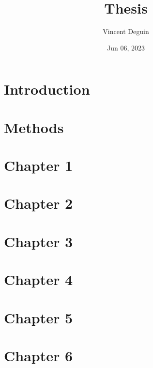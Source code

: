 \documentclass[letterpaper,10pt,english]{jupyterBook}
\title{Thesis}
\date{Jun 06, 2023}
\author{Vincent Deguin}
\begin{document}
\pagestyle{empty}
\sphinxmaketitle
\pagestyle{plain}
\sphinxtableofcontents
\pagestyle{normal}
\label{\detokenize{intro::doc}}


\sphinxstepscope


\chapter{Introduction}
\label{\detokenize{Introduction/Introduction:introduction}}\label{\detokenize{Introduction/Introduction::doc}}
\sphinxstepscope


\chapter{Methods}
\label{\detokenize{Methods/Methods:methods}}\label{\detokenize{Methods/Methods::doc}}
\sphinxstepscope


\chapter{Chapter 1}
\label{\detokenize{Chapter1/Chapter1:chapter-1}}\label{\detokenize{Chapter1/Chapter1::doc}}
\sphinxstepscope


\chapter{Chapter 2}
\label{\detokenize{Chapter2/Chapter2:chapter-2}}\label{\detokenize{Chapter2/Chapter2::doc}}
\sphinxstepscope


\chapter{Chapter 3}
\label{\detokenize{Chapter3/Chapter3:chapter-3}}\label{\detokenize{Chapter3/Chapter3::doc}}
\sphinxstepscope


\chapter{Chapter 4}
\label{\detokenize{Chapter4/Chapter4:chapter-4}}\label{\detokenize{Chapter4/Chapter4::doc}}
\sphinxstepscope


\chapter{Chapter 5}
\label{\detokenize{Chapter5/Chapter5:chapter-5}}\label{\detokenize{Chapter5/Chapter5::doc}}
\sphinxstepscope


\chapter{Chapter 6}
\label{\detokenize{Chapter6/Chapter6:chapter-6}}\label{\detokenize{Chapter6/Chapter6::doc}}
\sphinxstepscope
\end{document}
